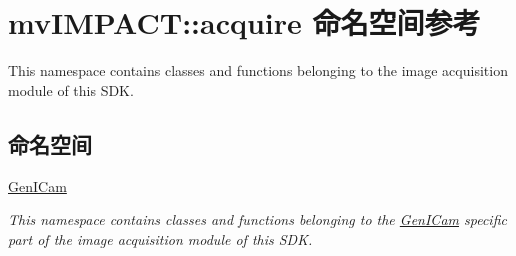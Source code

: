 \hypertarget{namespacemv_i_m_p_a_c_t_1_1acquire}{\section{mv\+I\+M\+P\+A\+C\+T\+:\+:acquire 命名空间参考}
\label{namespacemv_i_m_p_a_c_t_1_1acquire}
}


This namespace contains classes and functions belonging to the image acquisition module of this S\+D\+K.  


\subsection*{命名空间}
\begin{DoxyCompactItemize}
\item 
 \hyperlink{namespacemv_i_m_p_a_c_t_1_1acquire_1_1_gen_i_cam}{Gen\+I\+Cam}
\begin{DoxyCompactList}\small\item\em This namespace contains classes and functions belonging to the \hyperlink{namespacemv_i_m_p_a_c_t_1_1acquire_1_1_gen_i_cam}{Gen\+I\+Cam} specific part of the image acquisition module of this S\+D\+K. \end{DoxyCompactList}\end{DoxyCompactItemize}
